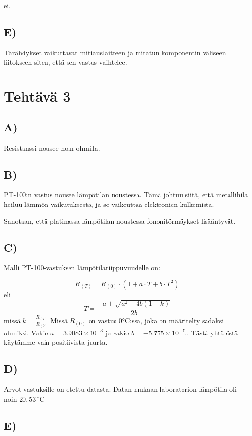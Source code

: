 \documentclass{article}
\begin{document}
ei.

\subsection*{E)}
Tärähdykset vaikuttavat mittauslaitteen ja mitatun komponentin väliseen liitokseen siten, 
että sen vastus vaihtelee.

\section*{Tehtävä 3}

\subsection*{A)}
Resistanssi nousee noin ohmilla.

\subsection*{B)}
PT-100:n vastus nousee lämpötilan noustessa. Tämä johtuu siitä, että metallihila heiluu lämmön vaikutuksesta, 
ja se vaikeuttaa elektronien kulkemista. \cite{therma_temperature_resistance}

Sanotaan, että platinassa lämpötilan noustessa fononitörmäykset lisääntyvät. 
\cite{wikipedia_phonon_scattering}

\subsection*{C)}
Malli PT-100-vastuksen lämpötilariippuvuudelle on:

\[
R_{(T)} = R_{(0)} \cdot \left( 1 + a \cdot T + b \cdot T^2 \right)
\]
eli
\[
T = \frac{-a \pm \sqrt{a^2 - 4b(1 - k)}}{2b}
\]
missä $k = \frac{R_{(T)}}{R_{(0)}}$
Missä $R_{(0)}$ on vastus 0°C:ssa, joka on määritelty sadaksi ohmiksi.
Vakio $a = 3.9083 \times 10^{-3}$ ja vakio $b = -5.775 \times 10^{-7}.$. Tästä yhtälöstä käytämme vain positiivista juurta.

\subsection*{D)}

Arvot vastuksille on otettu datasta. Datan mukaan laboratorion lämpötila oli noin $20,53\,^\circ \text{C}$

\subsection*{E)}
\end{document}
